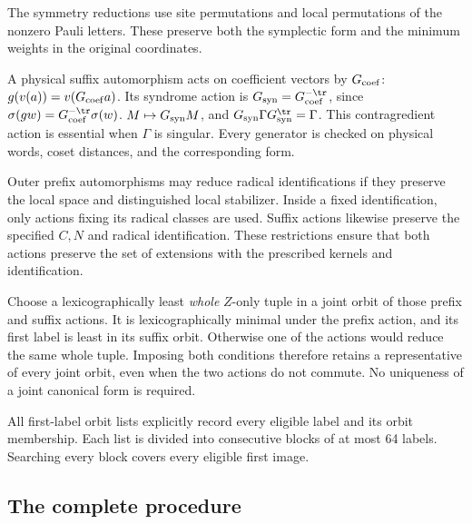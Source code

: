 The symmetry reductions use site permutations and local permutations
of the nonzero Pauli letters. These preserve both the symplectic form
and the minimum weights in the original coordinates.

A physical suffix automorphism acts on coefficient vectors by \(G_{\rm coef}\):
\(g(v(a))=v(G_{\rm coef}a)\). Its syndrome action is \(G_{\rm syn}=G_{\rm coef}^{-\tr}\), since
\(\sigma(gw)=G_{\rm coef}^{-\tr}\sigma(w)\). \(M\mapsto G_{\rm syn}M\), and
\(G_{\rm syn}\Gamma G_{\rm syn}^\tr=\Gamma\). This contragredient action is essential
when \(\Gamma\) is singular. Every generator is checked on physical
words, coset distances, and the corresponding form.

Outer prefix automorphisms may reduce radical identifications if they
preserve the local space and distinguished local stabilizer. Inside a
fixed identification, only actions fixing its radical classes are used.
Suffix actions likewise preserve the specified \(C,N\) and radical
identification. These restrictions ensure that both actions preserve
the set of extensions with the prescribed kernels and identification.

Choose a lexicographically least \emph{whole} \(Z\)-only tuple in a
joint orbit of those prefix and suffix actions. It is lexicographically minimal under the prefix action,
and its first label is least in its suffix orbit. Otherwise one of the
actions would reduce the same whole tuple. Imposing both conditions
therefore retains a representative of every joint orbit, even when the
two actions do not commute. No uniqueness of a joint canonical form
is required.

All first-label orbit lists explicitly record every eligible label and
its orbit membership. Each list is divided into consecutive blocks
of at most 64 labels. Searching every block covers every
eligible first image.

\subsection{The complete procedure}\label{sec:procedure}

